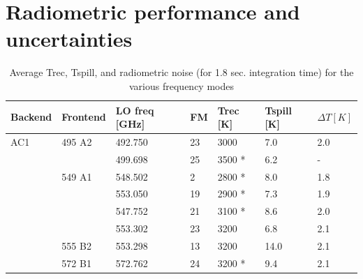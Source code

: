 \section{Radiometric performance and uncertainties}
\label{sec:radper}

\label{sec:radnoise}


\begin{table}
\caption{ Average Trec, Tspill, and radiometric noise (for 1.8 sec. integration time) for the various frequency modes }
\label{table:config5}
\begin{tabular}{|l|l|l|l|l|l|l|}
  \hline
  \textbf{Backend} & \textbf{Frontend} & \textbf{LO freq {[}GHz{]}} & \textbf{FM} & \textbf{Trec {[}K{]}} & \textbf{Tspill {[}K{]}} & \textbf{\(\Delta T [K]\)} \\
  \hline
  AC1              & 495 A2            & 492.750                    & 23          & 3000                  & 7.0  & 2.0\\
  \cline{3-3}
  \cline{4-4}
  \cline{5-5}
  \cline{6-6}
  \cline{7-7}
                   &                    & 499.698                   & 25          & 3500 *                & 6.2  & -\\
  \cline{2-2}
  \cline{3-3}
  \cline{4-4}
  \cline{5-5}
  \cline{6-6}
  \cline{7-7}
                   & 549 A1             & 548.502                  & 2            & 2800 *                & 8.0 & 1.8 \\
  \cline{3-3}
  \cline{4-4}
  \cline{5-5}
  \cline{6-6}
  \cline{7-7}
                  &                     & 553.050                  & 19           & 2900 *                & 7.3 & 1.9 \\
  \cline{3-3}
  \cline{4-4}
  \cline{5-5}
  \cline{6-6}
  \cline{7-7}
                  &                     & 547.752                  & 21           & 3100 *                & 8.6 & 2.0 \\
  \cline{3-3}
  \cline{4-4}
  \cline{5-5}
  \cline{6-6}
  \cline{7-7}
                  &                     & 553.302                  & 23           & 3200                  & 6.8 & 2.1 \\
  \cline{2-2}
  \cline{3-3}
  \cline{4-4}
  \cline{5-5}
  \cline{6-6}
  \cline{7-7}
                 & 555 B2              & 553.298                   & 13           & 3200                  & 14.0 & 2.1 \\
  \cline{2-2}
  \cline{3-3}
  \cline{4-4}
  \cline{5-5}
  \cline{6-6}
  \cline{7-7}
                & 572 B1               & 572.762                   & 24           & 3200 *                & 9.4 & 2.1 \\

\end{tabular}
\end{table}
